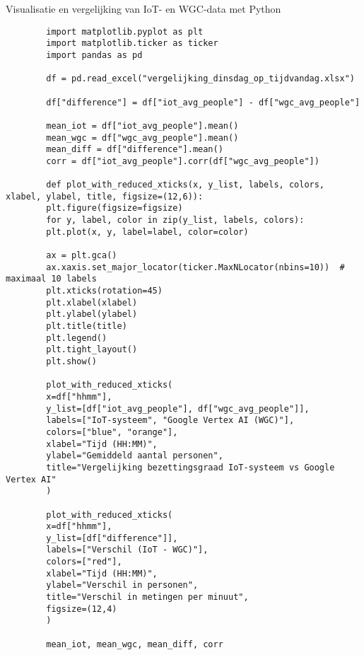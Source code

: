 \documentclass[dutch,dit,thesis]{hogentreport}
\begin{document}
\begin{listing}[H]
    \caption{Visualisatie en vergelijking van IoT- en WGC-data met Python}
    \label{lst:python-iot-wgc-plot}
    \begin{verbatim}
        import matplotlib.pyplot as plt
        import matplotlib.ticker as ticker
        import pandas as pd
        
        df = pd.read_excel("vergelijking_dinsdag_op_tijdvandag.xlsx")
        
        df["difference"] = df["iot_avg_people"] - df["wgc_avg_people"]
        
        mean_iot = df["iot_avg_people"].mean()
        mean_wgc = df["wgc_avg_people"].mean()
        mean_diff = df["difference"].mean()
        corr = df["iot_avg_people"].corr(df["wgc_avg_people"])
        
        def plot_with_reduced_xticks(x, y_list, labels, colors, xlabel, ylabel, title, figsize=(12,6)):
        plt.figure(figsize=figsize)
        for y, label, color in zip(y_list, labels, colors):
        plt.plot(x, y, label=label, color=color)
        
        ax = plt.gca()
        ax.xaxis.set_major_locator(ticker.MaxNLocator(nbins=10))  # maximaal 10 labels
        plt.xticks(rotation=45)
        plt.xlabel(xlabel)
        plt.ylabel(ylabel)
        plt.title(title)
        plt.legend()
        plt.tight_layout()
        plt.show()
        
        plot_with_reduced_xticks(
        x=df["hhmm"],
        y_list=[df["iot_avg_people"], df["wgc_avg_people"]],
        labels=["IoT-systeem", "Google Vertex AI (WGC)"],
        colors=["blue", "orange"],
        xlabel="Tijd (HH:MM)",
        ylabel="Gemiddeld aantal personen",
        title="Vergelijking bezettingsgraad IoT-systeem vs Google Vertex AI"
        )
        
        plot_with_reduced_xticks(
        x=df["hhmm"],
        y_list=[df["difference"]],
        labels=["Verschil (IoT - WGC)"],
        colors=["red"],
        xlabel="Tijd (HH:MM)",
        ylabel="Verschil in personen",
        title="Verschil in metingen per minuut",
        figsize=(12,4)
        )
        
        mean_iot, mean_wgc, mean_diff, corr
    \end{verbatim}
\end{listing}




\end{document}

